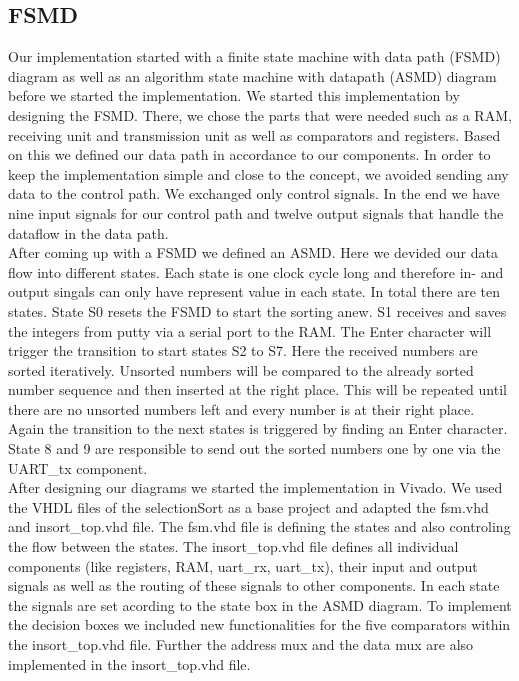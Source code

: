 \documentclass[conference]{IEEEtran}
\begin{document}
\subsection{FSMD}\label{section:fsmd}
Our implementation started with a finite state machine with data path (FSMD) diagram as well as an algorithm state machine with datapath (ASMD) diagram before we started the implementation. We started this implementation by designing the FSMD. There, we chose the parts that were needed such as a RAM, receiving unit and transmission unit as well as comparators and registers. Based on this we defined our data path in accordance to our components. In order to keep the implementation simple and close to the concept, we avoided sending any data to the control path. We exchanged only control signals. In the end we have nine input signals for our control path and twelve output signals that handle the dataflow in the data path.\\
After coming up with a FSMD we defined an ASMD. Here we devided our data flow into different states. Each state is one clock cycle long and therefore in- and output singals can only have represent value in each state. In total there are ten states. State S0 resets the FSMD to start the sorting anew. S1 receives and saves the integers from putty via a serial port to the RAM. The Enter character will trigger the transition to start states S2 to S7. Here the received numbers are sorted iteratively. Unsorted numbers will be compared to the already sorted number sequence and then inserted at the right place. This will be repeated until there are no unsorted numbers left and every number is at their right place. Again the transition to the next states is triggered by finding an Enter character. State 8 and 9 are responsible to send out the sorted numbers one by one via the UART\_tx component.\\
After designing our diagrams we started the implementation in Vivado. We used the VHDL files of the selectionSort as a base project and adapted the fsm.vhd and insort\_top.vhd file. The fsm.vhd file is defining the states and also controling the flow between the states. The insort\_top.vhd file defines all individual components (like registers, RAM, uart\_rx, uart\_tx), their input and output signals as well as the routing of these signals to other components. In each state the signals are set acording to the state box in the ASMD diagram. To implement the decision boxes we included new functionalities for the five comparators within the insort\_top.vhd file. Further the address mux and the data mux are also implemented in the insort\_top.vhd file.\\
\end{document}
